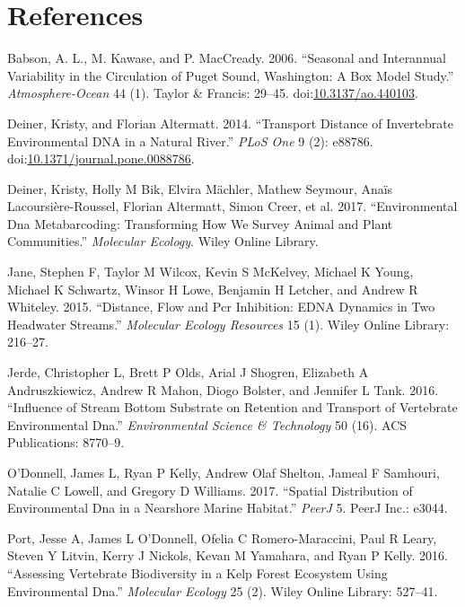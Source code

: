 \documentclass[fleqn,10pt,lineno]{wlpeerj} %
\begin{document}
\section*{References}\label{references}

\hypertarget{refs}{}
\hypertarget{ref-Babson2006}{}
Babson, A. L., M. Kawase, and P. MacCready. 2006. ``Seasonal and
Interannual Variability in the Circulation of Puget Sound, Washington: A
Box Model Study.'' \emph{Atmosphere-Ocean} 44 (1). Taylor \& Francis:
29--45. doi:\href{https://doi.org/10.3137/ao.440103}{10.3137/ao.440103}.

\hypertarget{ref-deiner_transport_2014-1}{}
Deiner, Kristy, and Florian Altermatt. 2014. ``Transport Distance of
Invertebrate Environmental DNA in a Natural River.'' \emph{PLoS One} 9
(2): e88786.
doi:\href{https://doi.org/10.1371/journal.pone.0088786}{10.1371/journal.pone.0088786}.

\hypertarget{ref-deiner2017environmental}{}
Deiner, Kristy, Holly M Bik, Elvira Mächler, Mathew Seymour, Anaïs
Lacoursière-Roussel, Florian Altermatt, Simon Creer, et al. 2017.
``Environmental Dna Metabarcoding: Transforming How We Survey Animal and
Plant Communities.'' \emph{Molecular Ecology}. Wiley Online Library.

\hypertarget{ref-jane2015distance}{}
Jane, Stephen F, Taylor M Wilcox, Kevin S McKelvey, Michael K Young,
Michael K Schwartz, Winsor H Lowe, Benjamin H Letcher, and Andrew R
Whiteley. 2015. ``Distance, Flow and Pcr Inhibition: EDNA Dynamics in
Two Headwater Streams.'' \emph{Molecular Ecology Resources} 15 (1).
Wiley Online Library: 216--27.

\hypertarget{ref-jerde2016influence}{}
Jerde, Christopher L, Brett P Olds, Arial J Shogren, Elizabeth A
Andruszkiewicz, Andrew R Mahon, Diogo Bolster, and Jennifer L Tank.
2016. ``Influence of Stream Bottom Substrate on Retention and Transport
of Vertebrate Environmental Dna.'' \emph{Environmental Science \&
Technology} 50 (16). ACS Publications: 8770--9.

\hypertarget{ref-o2017spatial}{}
O'Donnell, James L, Ryan P Kelly, Andrew Olaf Shelton, Jameal F
Samhouri, Natalie C Lowell, and Gregory D Williams. 2017. ``Spatial
Distribution of Environmental Dna in a Nearshore Marine Habitat.''
\emph{PeerJ} 5. PeerJ Inc.: e3044.

\hypertarget{ref-port2016assessing}{}
Port, Jesse A, James L O'Donnell, Ofelia C Romero-Maraccini, Paul R
Leary, Steven Y Litvin, Kerry J Nickols, Kevan M Yamahara, and Ryan P
Kelly. 2016. ``Assessing Vertebrate Biodiversity in a Kelp Forest
Ecosystem Using Environmental Dna.'' \emph{Molecular Ecology} 25 (2).
Wiley Online Library: 527--41.
\end{document}
